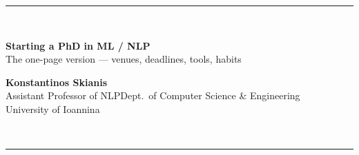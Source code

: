 \documentclass[10pt,a4paper]{article}
\begin{document}
\fontsize{6.35}{7.45}\selectfont

{\color{brandlight}\rule{\textwidth}{2pt}}\\[2pt]
\begin{minipage}[b]{0.63\textwidth}
{\fontsize{17}{18}\selectfont\bfseries\color{brand} Starting a PhD in ML / NLP}\\[2pt]
{\fontsize{8}{9}\selectfont\color{ink} The one-page version --- venues, deadlines, tools, habits}
\end{minipage}%
\hfill
\begin{minipage}[b]{0.36\textwidth}\raggedleft
{\fontsize{8}{9}\selectfont\bfseries\color{ink} Konstantinos Skianis}\\[1pt]
{\color{mutegray} Assistant Professor of NLP\dt Dept.\ of Computer Science \& Engineering\\
University of Ioannina\dt {}}
\end{minipage}\\[2pt]
{\color{brandlight}\rule{\textwidth}{2pt}}
\end{document}
